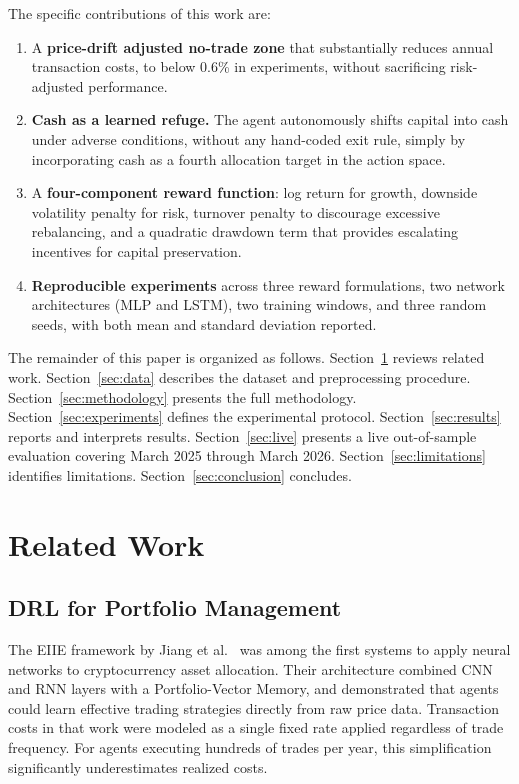 \documentclass[pdflatex,sn-mathphys-num]{sn-jnl}
\begin{document}
The specific contributions of this work are:

\begin{enumerate}[leftmargin=*]
\item A \textbf{price-drift adjusted no-trade zone} that substantially reduces annual transaction costs, to below 0.6\% in experiments, without sacrificing risk-adjusted performance.
\item \textbf{Cash as a learned refuge.} The agent autonomously shifts capital into cash under adverse conditions, without any hand-coded exit rule, simply by incorporating cash as a fourth allocation target in the action space.
\item A \textbf{four-component reward function}: log return for growth, downside volatility penalty for risk, turnover penalty to discourage excessive rebalancing, and a quadratic drawdown term that provides escalating incentives for capital preservation.
\item \textbf{Reproducible experiments} across three reward formulations, two network architectures (MLP and LSTM), two training windows, and three random seeds, with both mean and standard deviation reported.
\end{enumerate}

The remainder of this paper is organized as follows. Section~\ref{sec:related}
reviews related work. Section~\ref{sec:data} describes the dataset and
preprocessing procedure. Section~\ref{sec:methodology} presents the full
methodology. Section~\ref{sec:experiments} defines the experimental protocol.
Section~\ref{sec:results} reports and interprets results.
Section~\ref{sec:live} presents a live out-of-sample evaluation covering
March 2025 through March 2026. Section~\ref{sec:limitations} identifies limitations.
Section~\ref{sec:conclusion} concludes.

\section{Related Work}\label{sec:related}

\subsection{DRL for Portfolio Management}

The EIIE framework by Jiang et al.\ \cite{jiang2017deep} was among the first
systems to apply neural networks to cryptocurrency asset allocation. Their
architecture combined CNN and RNN layers with a Portfolio-Vector Memory, and
demonstrated that agents could learn effective trading strategies directly from
raw price data. Transaction costs in that work were modeled as a single fixed
rate applied regardless of trade frequency. For agents executing hundreds of
trades per year, this simplification significantly underestimates realized costs.
\end{document}
